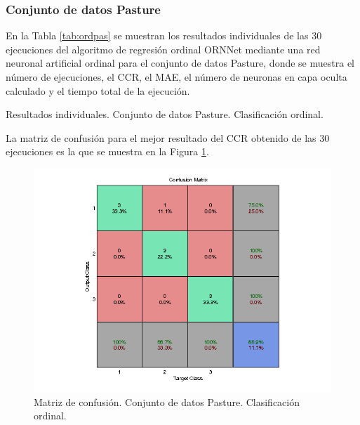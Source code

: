 			\subsubsection{Conjunto de datos Pasture}
			
			En la Tabla \ref{tab:ordpas} se muestran los resultados individuales de las 30 ejecuciones del algoritmo de regresión ordinal ORNNet mediante una red neuronal artificial ordinal para el conjunto de datos Pasture, donde se muestra el número de ejecuciones, el CCR, el MAE, el número de neuronas en capa oculta calculado y el tiempo total de la ejecución.\\
			
			\begin{table}[!htbp]
				\centering
				\caption{Resultados individuales. Conjunto de datos Pasture. Clasificación ordinal.}
				\label{tab:ordpas}
			\end{table}
			
			La matriz de confusión para el mejor resultado del CCR obtenido de las 30 ejecuciones es la que se muestra en la Figura \ref{fig:ordpas}.
			
			\begin{figure}[htbp]
				\centering
				\includegraphics[scale=0.8]{../src/results/ordinal/pasture_mc1.png}
				\caption{Matriz de confusión. Conjunto de datos Pasture. Clasificación ordinal.}
				\label{fig:ordpas}
			\end{figure}
			
